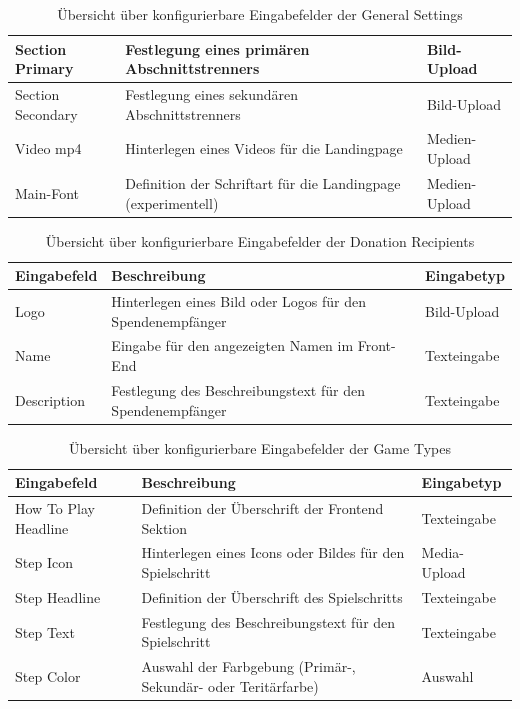 \documentclass[
	ngerman,
	BCOR=8mm,
	headings=normal,
	parskip=half,
	headsepline,
	automark,
	listof=totoc,
	bibliography=totoc,
]{scrreprt}
\begin{document}
\begin{table}[h]
\begin{tabular}{|p{3cm}|p{6cm}|p{5cm}|}
        \hline
        Section Primary & Festlegung eines primären Abschnittstrenners & Bild-Upload \\
        \hline
        Section Secondary & Festlegung eines sekundären Abschnittstrenners & Bild-Upload \\
        \hline
        Video \gls{mp4} & Hinterlegen eines Videos für die Landingpage & Medien-Upload          \\
        \hline
        Main-Font & Definition der Schriftart für die Landingpage (experimentell) & Medien-Upload \\
        \hline
    \end{tabular}
    \caption{Übersicht über konfigurierbare Eingabefelder der General Settings}
    \label{tab:eingabefelder_general_settings}
\end{table}

\begin{table}[h]
    \centering
    \renewcommand{\arraystretch}{1.3}
    \begin{tabular}{|p{3cm}|p{6cm}|p{5cm}|}
        \hline
        \textbf{Eingabefeld} & \textbf{Beschreibung} & \textbf{Eingabetyp} \\
        \hline
        Logo & Hinterlegen eines Bild oder Logos für den Spendenempfänger & Bild-Upload \\
        \hline
        Name & Eingabe für den angezeigten Namen im Front-End & Texteingabe \\
        \hline
        Description & Festlegung des Beschreibungstext für den Spendenempfänger  & Texteingabe \\
        \hline
    \end{tabular}
    \caption{Übersicht über konfigurierbare Eingabefelder der Donation Recipients}
    \label{tab:eingabefelder_donation_recipients}
\end{table}

\begin{table}[h]
    \centering
    \renewcommand{\arraystretch}{1.3}
    \begin{tabular}{|p{3cm}|p{6cm}|p{5cm}|}
        \hline
        \textbf{Eingabefeld} & \textbf{Beschreibung} & \textbf{Eingabetyp} \\
        \hline
        How To Play Headline & Definition der Überschrift der Frontend Sektion & Texteingabe \\
        \hline
        Step Icon & Hinterlegen eines Icons oder Bildes für den Spielschritt & Media-Upload \\
        \hline
        Step Headline & Definition der Überschrift des Spielschritts & Texteingabe \\
        \hline
        Step Text & Festlegung des Beschreibungstext für den Spielschritt  & Texteingabe \\
        \hline
        Step Color & Auswahl der Farbgebung (Primär-, Sekundär- oder Teritärfarbe)  & Auswahl \\
        \hline
    \end{tabular}
    \caption{Übersicht über konfigurierbare Eingabefelder der Game Types}
    \label{tab:eingabefelder_game_types}
\end{table}
\end{document}
